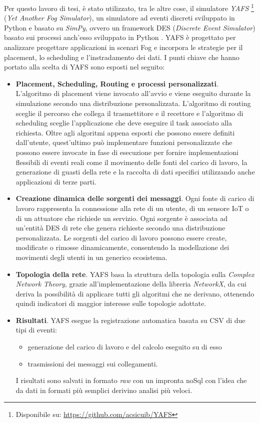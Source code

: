 Per questo lavoro di tesi, è stato utilizzato, tra le altre cose, il simulatore \textit{YAFS} \footnote{Disponibile su: \url{https://github.com/acsicuib/YAFS}} (\textit{Yet Another Fog Simulator}), un simulatore ad eventi discreti sviluppato in Python e basato su \textit{SimPy}, ovvero un framework DES (\textit{Discrete Event Simulator}) basato sui processi anch'esso sviluppato in Python \cite{YAFSSimulator}. YAFS è progettato per analizzare progettare applicazioni in scenari Fog e incorpora le strategie per il placement, lo scheduling e l'instradamento dei dati. I punti chiave che hanno portato alla scelta di YAFS sono esposti nel seguito:
\begin{itemize}
	\item \textbf{Placement, Scheduling, Routing e processi personalizzati}. L'algoritmo di placement viene invocato all'avvio e viene eseguito durante la simulazione secondo una distribuzione personalizzata. L'algoritmo di routing sceglie il percorso che collega il trasmettitore e il recettore e l'algoritmo di scheduling sceglie l'applicazione che deve eseguire il task associato alla richiesta. Oltre agli algoritmi appena esposti che possono essere definiti dall'utente, quest'ultimo può implementare funzioni personalizzate che possono essere invocate in fase di esecuzione per fornire implementazioni flessibili di eventi reali come il movimento delle fonti del carico di lavoro, la generazione di guasti della rete e la raccolta di dati specifici utilizzando anche applicazioni di terze parti.
	\item \textbf{Creazione dinamica delle sorgenti dei messaggi}. Ogni fonte di carico di lavoro rappresenta la connessione alla rete di un utente, di un sensore IoT o di un attuatore che richiede un servizio. Ogni sorgente è associata ad un'entità DES di rete che genera richieste secondo una distribuzione personalizzata. Le sorgenti del carico di lavoro possono essere create, modificate o rimosse dinamicamente, consentendo la modellazione dei movimenti degli utenti in un generico ecosistema.
	\item \textbf{Topologia della rete}. YAFS basa la struttura della topologia sulla \textit{Complex Network Theory}, grazie all'implementazione della libreria \textit{NetworkX}, da cui deriva la possibilità di applicare tutti gli algoritmi che ne derivano, ottenendo quindi indicatori di maggior interesse sulle topologie adottate.
	\item \textbf{Risultati}. YAFS esegue la registrazione automatica basata su CSV di due tipi di eventi: 
	\begin{itemize}
		\item generazione del carico di lavoro e del calcolo eseguito su di esso
		\item trasmissioni dei messaggi sui collegamenti. 
	\end{itemize}
	
	I risultati sono salvati in formato \textit{raw} con un impronta noSql con l'idea che da dati in formati più semplici derivino analisi più veloci.
\end{itemize}












